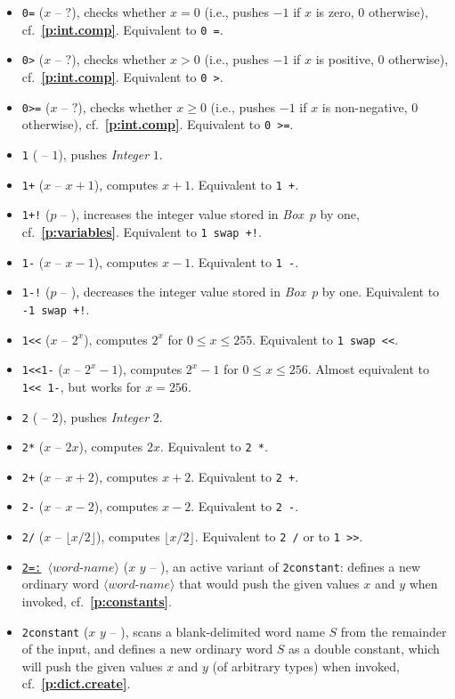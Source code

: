 \documentclass[12pt,oneside]{article}
\def\refpoint#1{{\rm\textbf{\ref{#1}}}}
\let\ptref=\refpoint
\begin{document}
\begin{itemize}
\item {\tt 0=} ($x$ -- $?$), checks whether $x=0$ (i.e., pushes $-1$ if $x$ is zero, $0$ otherwise), cf.~\ptref{p:int.comp}. Equivalent to {\tt 0 =}.
\item {\tt 0>} ($x$ -- $?$), checks whether $x>0$ (i.e., pushes $-1$ if $x$ is positive, $0$ otherwise), cf.~\ptref{p:int.comp}. Equivalent to {\tt 0 >}.
\item {\tt 0>=} ($x$ -- $?$), checks whether $x\geq0$ (i.e., pushes $-1$ if $x$ is non-negative, $0$ otherwise), cf.~\ptref{p:int.comp}. Equivalent to {\tt 0 >=}.
\item {\tt 1} ( -- $1$), pushes {\em Integer\/} $1$.
\item {\tt 1+} ($x$ -- $x+1$), computes $x+1$. Equivalent to {\tt 1 +}.
\item {\tt 1+!} ($p$ -- ), increases the integer value stored in {\em Box\/}~$p$ by one, cf.~\ptref{p:variables}. Equivalent to {\tt 1 swap +!}.
\item {\tt 1-} ($x$ -- $x-1$), computes $x-1$. Equivalent to {\tt 1 -}.
\item {\tt 1-!} ($p$ -- ), decreases the integer value stored in {\em Box\/}~$p$ by one. Equivalent to {\tt -1 swap +!}.
\item {\tt 1<{}<} ($x$ -- $2^x$), computes $2^x$ for $0\leq x\leq 255$. Equivalent to {\tt 1 swap <{}<}.
\item {\tt 1<{}<1-} ($x$ -- $2^x-1$), computes $2^x-1$ for $0\leq x\leq 256$. Almost equivalent to {\tt 1<{}< 1-}, but works for $x=256$.
\item {\tt 2} ( -- $2$), pushes {\em Integer\/} $2$.
\item {\tt 2*} ($x$ -- $2x$), computes $2x$. Equivalent to {\tt 2 *}.
\item {\tt 2+} ($x$ -- $x+2$), computes $x+2$. Equivalent to {\tt 2 +}.
\item {\tt 2-} ($x$ -- $x-2$), computes $x-2$. Equivalent to {\tt 2 -}.
\item {\tt 2/} ($x$ -- $\lfloor x/2\rfloor$), computes $\lfloor x/2\rfloor$. Equivalent to {\tt 2 /} or to {\tt 1 >{}>}.
\item {\tt \underline{2=:} $\langle\textit{word-name}\rangle$} ($x$ $y$ -- ), an active variant of {\tt 2constant}: defines a new ordinary word $\langle\textit{word-name}\rangle$ that would push the given values $x$ and $y$ when invoked, cf.~\ptref{p:constants}.
\item {\tt 2constant} ($x$ $y$ -- ), scans a blank-delimited word name $S$ from the remainder of the input, and defines a new ordinary word $S$ as a double constant, which will push the given values $x$ and $y$ (of arbitrary types) when invoked, cf.~\ptref{p:dict.create}.

\end{itemize}
\end{document}
